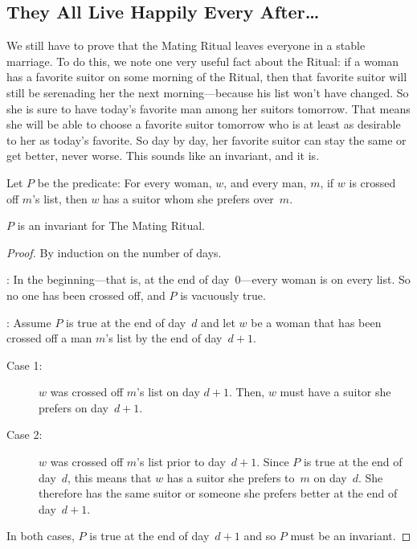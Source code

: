 \subsection{They All Live Happily Every After\dots}

We still have to prove that the Mating Ritual leaves everyone in a
stable marriage.  To do this, we note one very useful fact about the
Ritual: if a woman has a favorite suitor on some morning of the
Ritual, then that favorite suitor will still be serenading her the
next morning---because his list won't have changed.  So she is sure to
have today's favorite man among her suitors tomorrow.  That means she
will be able to choose a favorite suitor tomorrow who is at least as
desirable to her as today's favorite.  So day by day, her favorite
suitor can stay the same or get better, never worse.  This sounds like
an invariant, and it is.

\begin{definition}\label{def:P8}
Let $P$ be the predicate: For every woman, $w$, and every man, $m$, if
$w$ is crossed off $m$'s list, then $w$ has a suitor whom she prefers
over~$m$.
\end{definition}

\begin{lemma}\label{lem:5P}
$P$ is an invariant for The Mating Ritual.
\end{lemma}

\begin{proof}
By induction on the number of days.

: In the beginning---that is, at the end of
day~0---every woman is on every list.  So no one has been crossed off, and
$P$ is vacuously true.

: Assume $P$ is true at the end of
day~$d$ and let $w$ be a woman that has been crossed off a man $m$'s
list by the end of day~$d + 1$.

\begin{description}

\item[Case 1:]
$w$ was crossed off $m$'s list on day $d + 1$.  Then, $w$ must have a
  suitor she prefers on day~$d+1$.

\item[Case 2:]
$w$ was crossed off $m$'s list prior to day~$d+1$.  Since $P$ is true
  at the end of day~$d$, this means that $w$ has a suitor she prefers
  to~$m$ on day~$d$.  She therefore has the same suitor or someone she
  prefers better at the end of day~$d + 1$.

\end{description}
In both cases, $P$ is true at the end of day~$d + 1$ and so $P$ must
be an invariant.
\end{proof}

